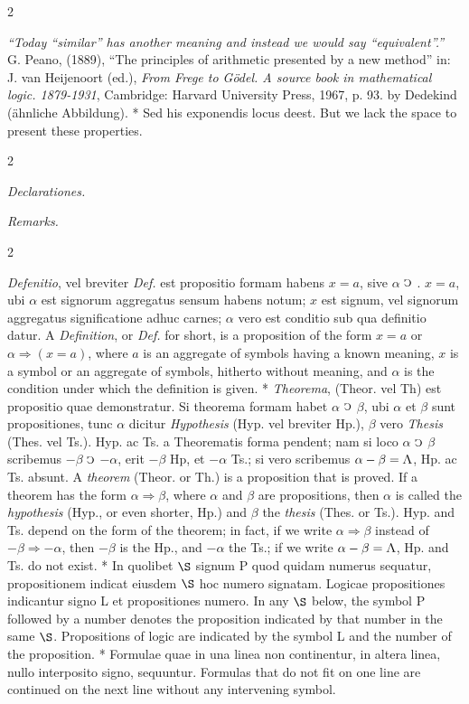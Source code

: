 \documentclass{book}
\newcommand{\C}{\mathop{\sbox0{$\displaystyle$$\reflectbox{C}$} %
\raisebox{-\height+\ht0-0.05cm}[\ht0][\dp0]{\scalebox{0.8}[0.8]{\copy0}}}\displaylimits} %
\newcommand{\abs}{\mathop{\rotatebox[origin=c]{180}{V}}}
\renewcommand{\rightarrow}{\Rightarrow}
\newcommand\peanoHeadingSmall[1]{ \vspace{0.75cm} \textit{#1} \nopagebreak[4]

\vspace{0.25cm} \nopagebreak[1]}
\newenvironment{translateTwoCol}
               { %
                 \columnratio{0.5, 0.5}
                 \begin{paracol}{2}
                 \newcommand{\LAT}{\switchcolumn[0]*}
                 \newcommand{\ENG}{\switchcolumn[1]}
               }
               { %
                 \let\ENG\undefined
                 \let\LAT\undefined
                 \end{paracol}
               }
\begin{document}
\begin{translateTwoCol}
{\quad \emph{``Today ``similar'' has another meaning and instead we would say ``equivalent''.''} \\

G. Peano, (1889), ``The principles of arithmetic presented by a new method'' in: J. van Heijenoort (ed.), \emph{From Frege to G\"odel. A source book in mathematical logic. 1879-1931}, Cambridge: Harvard University Press, 1967, p. 93.} by Dedekind (\"ahnliche Abbildung).
\LAT
Sed his exponendis locus deest.
\ENG
But we lack the space to present these properties.
\end{translateTwoCol}

\begin{translateTwoCol}
\centering
{}
{}
\peanoHeadingSmall{Declarationes.}
\ENG
\peanoHeadingSmall{Remarks.}
\end{translateTwoCol}

\begin{translateTwoCol}
\emph{Defenitio}, vel breviter \emph{Def.} est propositio formam habens $x = a$, sive $\alpha$ $\C$ . $x = a$, ubi $\alpha$ est signorum aggregatus sensum habens notum; $x$ est signum, vel signorum aggregatus significatione adhuc carnes; $\alpha$ vero est conditio sub qua definitio datur.
\ENG
A \emph{Definition}, or \emph{Def.} for short, is a proposition of the form $x=a$ or $\alpha \rightarrow (x = a)$, where $a$ is an aggregate of symbols having a known meaning, $x$ is a symbol or an aggregate of symbols, hitherto without meaning, and $\alpha$ is the condition under which the definition is given.
\LAT
\emph{Theorema}, (Theor. vel Th) est propositio quae demonstratur. Si theorema formam habet $\alpha$ $\C$ $\beta$, ubi $\alpha$ et $\beta$ sunt propositiones, tunc $\alpha$ dicitur \emph{Hypothesis} (Hyp. vel breviter Hp.), $\beta$ vero \emph{Thesis} (Thes. vel Ts.). Hyp. ac Ts. a Theorematis forma pendent; nam si loco $\alpha$ $\C$ $\beta$ scribemus $- \beta$ $\C$ $- \alpha$, erit $- \beta$ Hp, et $- \alpha$ Ts.; si vero scribemus $\alpha - \beta = \abs$, Hp. ac Ts. absunt.
\ENG
A \emph{theorem} (Theor. or Th.) is a proposition that is proved. If a theorem has the form $\alpha \rightarrow \beta$, where $\alpha$ and $\beta$ are propositions, then $\alpha$ is called the \emph{hypothesis} (Hyp., or even shorter, Hp.) and $\beta$ the \emph{thesis} (Thes. or Ts.). Hyp. and Ts. depend on the form of the theorem; in fact, if we write $\alpha \rightarrow \beta$ instead of $- \beta \rightarrow - \alpha$, then $- \beta$ is the Hp., and $- \alpha$ the Ts.; if we write $\alpha - \beta = \abs$, Hp. and Ts. do not exist.
\LAT
In quolibet $\S$ signum P quod quidam numerus sequatur, propositionem indicat eiusdem $\S$ hoc numero signatam. Logicae propositiones indicantur signo L et propositiones numero.
\ENG
In any $\S$ below, the symbol P followed by a number denotes the proposition indicated by that number in the same $\S$. Propositions of logic are indicated by the symbol L and the number of the proposition.
\LAT
Formulae quae in una linea non continentur, in altera linea, nullo interposito signo, sequuntur.
\ENG
Formulas that do not fit on one line are continued on the next line without any intervening symbol.
\end{translateTwoCol}
\end{document}
